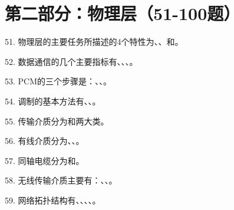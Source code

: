 \section{第二部分：物理层（51-100题）}

51. 物理层的主要任务所描述的4个特性为\underline{\hspace{2cm}}、\underline{\hspace{2cm}}、\underline{\hspace{2cm}}和\underline{\hspace{2cm}}。

52. 数据通信的几个主要指标有\underline{\hspace{2cm}}、\underline{\hspace{2cm}}、\underline{\hspace{2cm}}、\underline{\hspace{2cm}}。

53. PCM的三个步骤是：\underline{\hspace{2cm}}、\underline{\hspace{2cm}}、\underline{\hspace{2cm}}。

54. 调制的基本方法有\underline{\hspace{2cm}}、\underline{\hspace{2cm}}、\underline{\hspace{2cm}}。

55. 传输介质分为\underline{\hspace{2cm}}和\underline{\hspace{2cm}}两大类。

56. 有线介质分为\underline{\hspace{2cm}}、\underline{\hspace{2cm}}、\underline{\hspace{2cm}}。

57. 同轴电缆分为\underline{\hspace{2cm}}和\underline{\hspace{2cm}}。

58. 无线传输介质主要有：\underline{\hspace{2cm}}、\underline{\hspace{2cm}}、\underline{\hspace{2cm}}。

59. 网络拓扑结构有\underline{\hspace{1.5cm}}、\underline{\hspace{1.5cm}}、\underline{\hspace{1.5cm}}、\underline{\hspace{1.5cm}}、\underline{\hspace{1.5cm}}。

